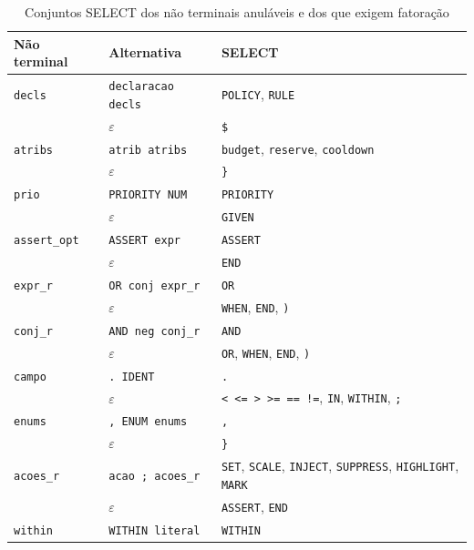 \documentclass[conference]{IEEEtran}
\begin{document}
\begin{table}[htbp]
\caption{Conjuntos SELECT dos não terminais anuláveis e dos que exigem
fatoração}
\label{tab:select}
\centering
\scriptsize
\setlength{\tabcolsep}{3pt}
\begin{tabularx}{\columnwidth}{@{}l >{\raggedright\arraybackslash}p{} L@{}}
\toprule
\textbf{Não terminal} & \textbf{Alternativa} & \textbf{SELECT} \\
\midrule
\texttt{decls}      & \texttt{declaracao decls} & \texttt{POLICY}, \texttt{RULE} \\
                    & $\varepsilon$ & \texttt{\$} \\
\texttt{atribs}     & \texttt{atrib atribs} & \texttt{budget}, \texttt{reserve}, \texttt{cooldown} \\
                    & $\varepsilon$ & \texttt{\}} \\
\texttt{prio}       & \texttt{PRIORITY NUM} & \texttt{PRIORITY} \\
                    & $\varepsilon$ & \texttt{GIVEN} \\
\texttt{assert\_opt}& \texttt{ASSERT expr} & \texttt{ASSERT} \\
                    & $\varepsilon$ & \texttt{END} \\
\texttt{expr\_r}    & \texttt{OR conj expr\_r} & \texttt{OR} \\
                    & $\varepsilon$ & \texttt{WHEN}, \texttt{END}, \texttt{)} \\
\texttt{conj\_r}    & \texttt{AND neg conj\_r} & \texttt{AND} \\
                    & $\varepsilon$ & \texttt{OR}, \texttt{WHEN}, \texttt{END}, \texttt{)} \\
\texttt{campo}      & \texttt{. IDENT} & \texttt{.} \\
                    & $\varepsilon$ & \texttt{< <= > >= == !=}, \texttt{IN}, \texttt{WITHIN}, \texttt{;} \\
\texttt{enums}      & \texttt{, ENUM enums} & \texttt{,} \\
                    & $\varepsilon$ & \texttt{\}} \\
\texttt{acoes\_r}   & \texttt{acao ; acoes\_r} & \texttt{SET}, \texttt{SCALE}, \texttt{INJECT}, \texttt{SUPPRESS}, \texttt{HIGHLIGHT}, \texttt{MARK} \\
                    & $\varepsilon$ & \texttt{ASSERT}, \texttt{END} \\
\texttt{within}     & \texttt{WITHIN literal} & \texttt{WITHIN} \\

\end{tabularx}
\end{table}
\end{document}
